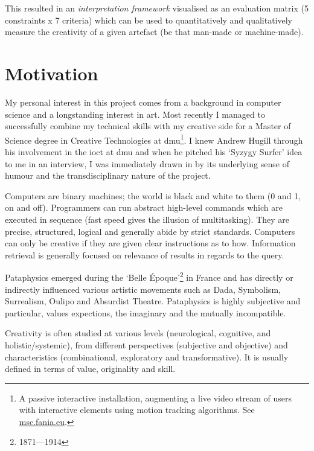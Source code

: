 This resulted in an \emph{interpretation framework} visualised as an evaluation matrix (5 constraints x 7 criteria) which can be used to quantitatively and qualitatively measure the creativity of a given artefact (be that man-made or machine-made).


\section{Motivation}

My personal interest in this project comes from a background in computer science and a longstanding interest in art. Most recently I managed to successfully combine my technical skills with my creative side for a Master of Science degree in Creative Technologies at \gls{dmu}\footnote{A passive interactive installation, augmenting a live video stream of users with interactive elements using motion tracking algorithms. See \url{msc.fania.eu}.}. I knew Andrew Hugill through his involvement in the \gls{ioct} at \gls{dmu} and when he pitched his `Syzygy Surfer' \autocite{Hendler2011, Hendler2013} idea to me in an interview, I was immediately drawn in by its underlying sense of humour and the transdisciplinary nature of the project.

\spirals

Computers are binary machines; the world is black and white to them (0 and 1, on and off). Programmers can run abstract high-level commands which are executed in sequence (fast speed gives the illusion of multitasking). They are precise, structured, logical and generally abide by strict standards. Computers can only be creative if they are given clear instructions as to how. Information retrieval is generally focused on relevance of results in regards to the query.

Pataphysics emerged during the `Belle Époque'\footnote{1871---1914} in France and has directly or indirectly influenced various artistic movements such as Dada, Symbolism, Surrealism, Oulipo and Absurdist Theatre. Pataphysics is highly subjective and particular, values expections, the imaginary and the mutually incompatible.

Creativity is often studied at various levels (neurological, cognitive, and holistic/systemic), from different perspectives (subjective and objective) and characteristics (combinational, exploratory and transformative). It is usually defined in terms of value, originality and skill.

